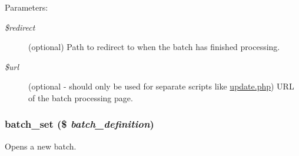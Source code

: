 \begin{Desc}
\item[Parameters:]
\begin{description}
\item[{\em \$redirect}](optional) Path to redirect to when the batch has finished processing. \item[{\em \$url}](optional - should only be used for separate scripts like \hyperlink{update_8php}{update.php}) URL of the batch processing page. \end{description}
\end{Desc}
\hypertarget{group__batch_g9ff3f18b3bdd1d62ab7ac681a22a7170}{
\subsubsection[{batch\_\-set}]{\setlength{\rightskip}{0pt plus 5cm}batch\_\-set (\$ {\em batch\_\-definition})}}
\label{group__batch_g9ff3f18b3bdd1d62ab7ac681a22a7170}


Opens a new batch.

